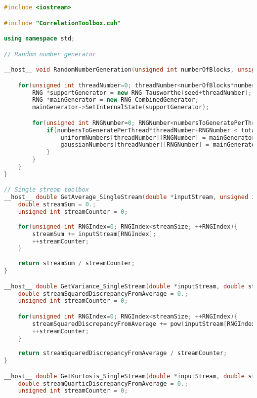\begin{lstlisting}[language=C++, caption={\texttt{libraries/CoreLibraries/RandomGenerator/CorrelationToolbox.cu}}]
#include <iostream>

#include "CorrelationToolbox.cuh"

using namespace std;

// Random number generator

__host__ void RandomNumberGeneration(unsigned int numberOfBlocks, unsigned int numberOfThreadsPerBlock, double **uniformNumbers, double **gaussianNumbers, unsigned int totalNumbersToGenerate, unsigned int numbersToGeneratePerThread, unsigned int seed){

	for(unsigned int threadNumber=0; threadNumber<numberOfBlocks*numberOfThreadsPerBlock; ++threadNumber){
		RNG *supportGenerator = new RNG_Tausworthe(seed+threadNumber);
		RNG *mainGenerator = new RNG_CombinedGenerator;
		mainGenerator->SetInternalState(supportGenerator);

		for(unsigned int RNGNumber=0; RNGNumber<numbersToGeneratePerThread; ++RNGNumber){		
			if(numbersToGeneratePerThread*threadNumber+RNGNumber < totalNumbersToGenerate){
				uniformNumbers[threadNumber][RNGNumber] = mainGenerator->GetUniform();
				gaussianNumbers[threadNumber][RNGNumber] = mainGenerator->GetGauss();
			}
		}
	}
}

// Single stream toolbox
__host__ double GetAverage_SingleStream(double *inputStream, unsigned int streamSize){
	double streamSum = 0.;
	unsigned int streamCounter = 0;
	
	for(unsigned int RNGIndex=0; RNGIndex<streamSize; ++RNGIndex){
		streamSum += inputStream[RNGIndex];
		++streamCounter;
	}
	
	return streamSum / streamCounter;
}

__host__ double GetVariance_SingleStream(double *inputStream, double streamAverage, unsigned int streamSize){
	double streamSquaredDiscrepancyFromAverage = 0.;
	unsigned int streamCounter = 0;

	for(unsigned int RNGIndex=0; RNGIndex<streamSize; ++RNGIndex){
		streamSquaredDiscrepancyFromAverage += pow(inputStream[RNGIndex] - streamAverage,2);
		++streamCounter;
	}
	
	return streamSquaredDiscrepancyFromAverage / streamCounter;	
}

__host__ double GetKurtosis_SingleStream(double *inputStream, double streamAverage, double streamVariance, unsigned int streamSize){
	double streamQuarticDiscrepancyFromAverage = 0.;
	unsigned int streamCounter = 0;
	

\end{lstlisting}

